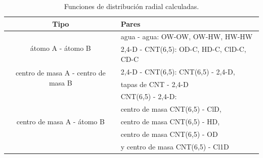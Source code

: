 \begin{table}[h!]
    \centering
    \begin{tabular}{ |c|l|  }
    \hline
    Tipo & Pares \\
    \hline
    \multirow{2}{*}{átomo A - átomo B} 
    & agua - agua: OW-OW, OW-HW, HW-HW \\ 
    & 2,4-D - CNT(6,5): OD-C, HD-C, ClD-C, CD-C \\ 
    \hline
    \multirow{2}{*}{centro de masa A - centro de masa B} 
     & 2,4-D - CNT(6,5): CNT(6,5) - 2,4-D,\\
     & tapas de CNT - 2,4-D \\
    \hline
    \multirow{5}{*}{centro de masa A - átomo B} 
    & CNT(6,5) - 2,4-D: \\
    & centro de masa CNT(6,5) - ClD, \\ 
    & centro de masa CNT(6,5) - HD, \\
    & centro de masa CNT(6,5) - OD \\
     & y centro de masa CNT(6,5) - Cl1D \\
    \hline
    \end{tabular}
    \caption{Funciones de distribución radial calculadas.}
    \label{tab:funcrad}
\end{table}
